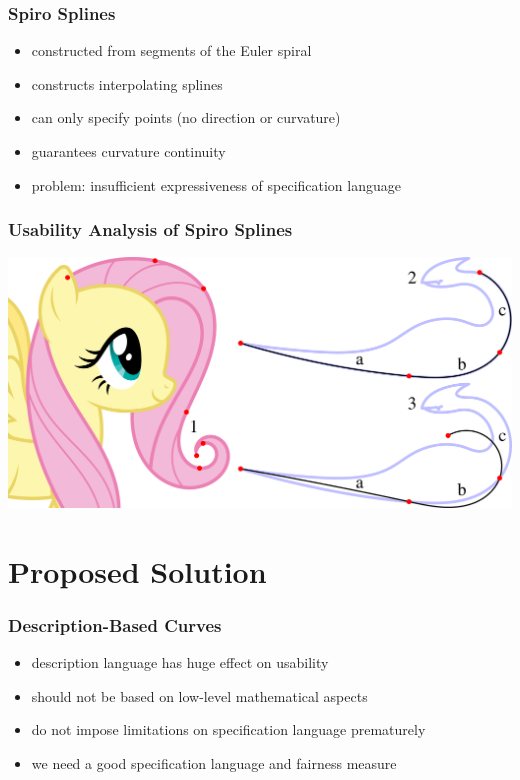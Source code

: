 \documentclass{beamer}
\begin{document}
		\begin{frame}
			\frametitle{Spiro Splines}
			\begin{itemize}
				\item constructed from segments of the Euler spiral
				\item constructs interpolating splines
				\item can only specify points (no direction or curvature)
				\item guarantees curvature continuity
				\item problem: insufficient expressiveness of specification language
			\end{itemize}
		\end{frame}
		
		\begin{frame}
			\frametitle{Usability Analysis of Spiro Splines}
			\begin{centering}
				\includegraphics[width=\textwidth]{../resources/usability_spiro.pdf}\\
			\end{centering}
		\end{frame}
	
	\section{Proposed Solution}
	
		\begin{frame}
			\frametitle{Description-Based Curves}
			\begin{itemize}
				\item description language has huge effect on usability
				\item should not be based on low-level mathematical aspects %
				\item do not impose limitations on specification language prematurely %
				\item we need a good specification language and fairness measure
			\end{itemize}
		\end{frame}
	
\end{document}
